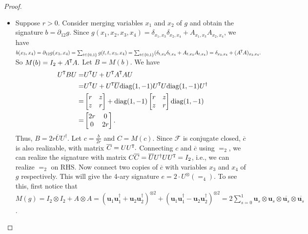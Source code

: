 \begin{proof}
\begin{itemize}
        \item Suppose $r>0.$
        Consider merging variables $x_1$ and $x_2$ of $g$ and obtain the signature $b=\partial_{12}g.$
        Since $g(x_1,x_2,x_3,x_4)=\delta_{x_1,x_3}\delta_{x_2,x_4}+A_{x_1,x_3}A_{x_2,x_4}$, we have 
        $b(x_3,x_4)=\partial_{12}g(x_3,x_4)=\sum_{t\in\{0,1\}}g(t,t,x_3,x_4)=\sum_{t\in\{0,1\}}(\delta_{t,x_3}\delta_{t,x_4}+A_{t,x_3}A_{t,x_4})=\delta_{x_3,x_4}+(A^{\tt T}A)_{x_3,x_4}.$
        So $M(b)=I_2+A^{\tt T}A.$
        Let $B=M(b).$
        We have
        \begin{equation}
            \begin{aligned}
                U^{\tt T}BU
                =&U^{\tt T}U+U^{\tt T}A^{\tt T}AU\\
                =&U^{\tt T}U+U^{\tt T}\overline{U}\mathrm{diag}(1,-1)U^{\tt T}U\mathrm{diag}(1,-1)U^{\dagger}\\
                =& \left[\begin{matrix}
                r & z\\
                z & r
                \end{matrix}\right]
                +\mathrm{diag}(1,-1)\left[\begin{matrix}
                r & z\\
                z & r
                \end{matrix}\right]\mathrm{diag}(1,-1)\\
                =&\left[\begin{matrix}
                2r & 0\\
                0 & 2r
                \end{matrix}\right].
            \end{aligned}
        \end{equation}
        Thus, $B=2r\overline{U}U^\dagger.$
        Let $c=\frac{b}{2r}$ and $C=M(c)$.
        Since $\mathcal{F}$ is conjugate closed, $\overline{c}$ is also realizable, with matrix $\overline{C}=UU^{\tt T}.$
        Connecting $c$ and $\overline{c}$ using $=_2$, we can realize the signature with matrix $C\overline{C}=\overline{U} U^\dagger UU^{\tt T}=I_2$, i.e., we can realize $=_2$ on RHS.
        Now connect two copies of $\overline{c}$ with variables $x_3$ and $x_4$ of $g$ respectively.
        This will give the 4-ary signature $e=2\cdot U^{\otimes}(=_4)$.
        To see this, first notice that $M(g)=I_2\otimes I_2+A\otimes A=(\mathbf{u}_1\mathbf{u}_1^\dagger+\mathbf{u}_2\mathbf{u}_2^\dagger)^{\otimes 2}+(\mathbf{u}_1\mathbf{u}_1^\dagger-\mathbf{u}_2\mathbf{u}_2^\dagger)^{\otimes 2}=2\sum_{s=0}^1\mathbf{u}_s\otimes \mathbf{u}_s\otimes \overline{\mathbf{u}_s}\otimes \overline{\mathbf{u}_s}$.

\end{itemize}
\end{proof}
